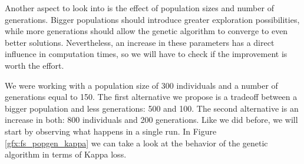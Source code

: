     Another aspect to look into is the effect of population sizes and number of generations. Bigger populations should introduce greater exploration possibilities, while more generations should allow the genetic algorithm to converge to even better solutions. Nevertheless, an increase in these parameters has a direct influence in computation times, so we will have to check if the improvement is worth the effort.

    We were working with a population size of 300 individuals and a number of generations equal to 150. The first alternative we propose is a tradeoff between a bigger population and less generations: 500 and 100. The second alternative is an increase in both: 800 individuals and 200 generations. Like we did before, we will start by observing what happens in a single run. In Figure \ref{gfx:fs_popgen_kappa} we can take a look at the behavior of the genetic algorithm in terms of Kappa loss.

    \vspace{0.3cm}

